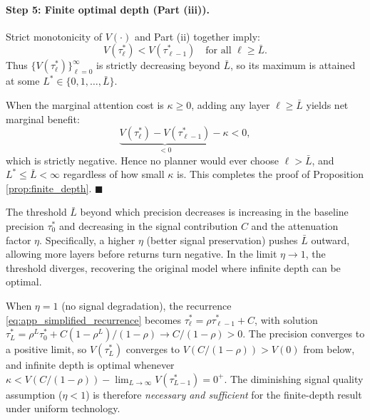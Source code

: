 \paragraph{Step 5: Finite optimal depth (Part (iii)).}
Strict monotonicity of $V(\cdot)$ and Part (ii) together imply:
\begin{equation}
V(\tau^{*}_{\ell}) < V(\tau^{*}_{\ell-1}) \quad \text{for all } \ell \geq \bar{L}.
\end{equation}
Thus $\{V(\tau^{*}_{\ell})\}_{\ell=0}^{\infty}$ is strictly decreasing beyond $\bar{L}$, so its maximum is attained at some $L^{*} \in \{0, 1, \ldots, \bar{L}\}$.

When the marginal attention cost is $\kappa \geq 0$, adding any layer $\ell \geq \bar{L}$ yields net marginal benefit:
\begin{equation}
\underbrace{V(\tau^{*}_{\ell}) - V(\tau^{*}_{\ell-1})}_{< 0} - \kappa < 0,
\end{equation}
which is strictly negative. Hence no planner would ever choose $\ell > \bar{L}$, and $L^{*} \leq \bar{L} < \infty$ regardless of how small $\kappa$ is. This completes the proof of Proposition \ref{prop:finite_depth}. \hfill $\blacksquare$

\vspace{1.5em}
\begin{remark}
The threshold $\bar{L}$ beyond which precision decreases is increasing in the baseline precision $\tau^{*}_{0}$ and decreasing in the signal contribution $C$ and the attenuation factor $\eta$. Specifically, a higher $\eta$ (better signal preservation) pushes $\bar{L}$ outward, allowing more layers before returns turn negative. In the limit $\eta \to 1$, the threshold diverges, recovering the original model where infinite depth can be optimal.
\end{remark}

\begin{remark}
When $\eta = 1$ (no signal degradation), the recurrence \eqref{eq:app_simplified_recurrence} becomes $\tau^{*}_{\ell} = \rho \tau^{*}_{\ell-1} + C$, with solution $\tau^{*}_{L} = \rho^{L}\tau^{*}_{0} + C(1-\rho^{L})/(1-\rho) \to C/(1-\rho) > 0$. The precision converges to a positive limit, so $V(\tau^{*}_{L})$ converges to $V(C/(1-\rho)) > V(0)$ from below, and infinite depth is optimal whenever $\kappa < V(C/(1-\rho)) - \lim_{L\to\infty}V(\tau^{*}_{L-1}) = 0^{+}$. The diminishing signal quality assumption ($\eta < 1$) is therefore \emph{necessary and sufficient} for the finite-depth result under uniform technology.
\end{remark}

